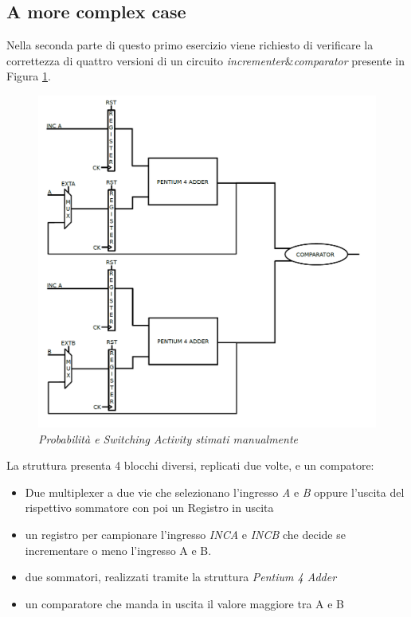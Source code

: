 \subsection{A more complex case}
Nella seconda parte di questo primo esercizio viene richiesto di verificare la correttezza di quattro versioni di un circuito \textit{incrementer$\&$comparator} presente in Figura \ref{pentium}.
\begin{figure}[!htb]
	\centering
	\includegraphics[scale=1]{immagini/pentium}
	\caption{\textit{Probabilità e Switching Activity stimati manualmente}}
	\label{pentium}
\end{figure}
La struttura presenta 4 blocchi diversi, replicati due volte, e un compatore:
\begin{itemize}
	\item  Due multiplexer a due vie che selezionano l'ingresso \textit{A} e \textit{B} oppure l'uscita del rispettivo sommatore con poi un Registro in uscita
	\item un registro per campionare l'ingresso \textit{INCA} e \textit{INCB} che decide se incrementare o meno l'ingresso A e B.
	\item due sommatori, realizzati tramite la struttura \textit{Pentium 4 Adder}
	\item un comparatore che manda in uscita il valore maggiore tra A e B
\end{itemize}
